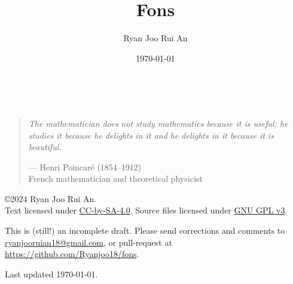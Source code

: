 \documentclass[12pt,a4 paper]{extreport}
\begin{document}
\begin{titlepage}
\title{\sffamily\bfseries Fons}
\author{Ryan Joo Rui An}
\date{\today}

\vfill
{}
\vfill
\vfill
\end{titlepage}

\maketitle
\pagebreak

\

\vfill

\begin{quote}
\textit{The mathematician does not study mathematics because it is useful; he studies it because he delights in it and he delights in it because it is beautiful.}

\begin{flushright}--- Henri Poincar\'{e} (1854--1912)\\
French mathematician and theoretical physicist\end{flushright}
\end{quote}

\vfill

\copyright 2024 Ryan Joo Rui An.\\
Text licensed under \href{https://creativecommons.org/licenses/by-sa/4.0/}{CC-by-SA-4.0}. Source files licensed under \href{https://choosealicense.com/licenses/gpl-3.0/}{GNU GPL v3}.

This is (still!) an incomplete draft. Please send corrections and comments to \url{ryanjooruian18@gmail.com}, or pull-request at \url{https://github.com/Ryanjoo18/fons}.

Last updated \today.
\thispagestyle{empty}


\pagebreak
\end{document}

